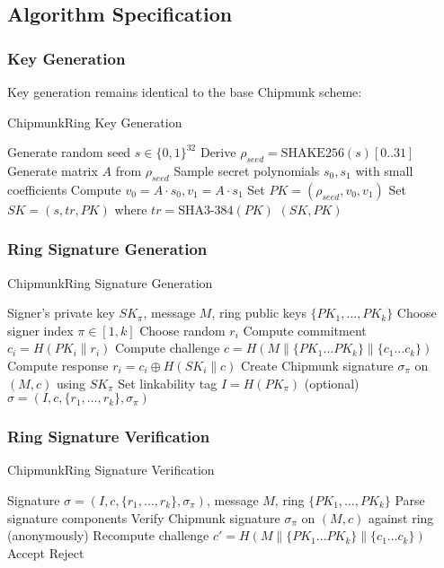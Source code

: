 \documentclass[11pt,a4paper]{article}
\begin{document}
\subsection{Algorithm Specification}

\subsubsection{Key Generation}
Key generation remains identical to the base Chipmunk scheme:
\begin{algorithm}
\caption{ChipmunkRing Key Generation}
\begin{algorithmic}[1]
\STATE Generate random seed $s \in \{0,1\}^{32}$
\STATE Derive $\rho_{seed} = \text{SHAKE256}(s)[0..31]$
\STATE Generate matrix $A$ from $\rho_{seed}$
\STATE Sample secret polynomials $s_0, s_1$ with small coefficients
\STATE Compute $v_0 = A \cdot s_0, v_1 = A \cdot s_1$
\STATE Set $PK = (\rho_{seed}, v_0, v_1)$
\STATE Set $SK = (s, tr, PK)$ where $tr = \text{SHA3-384}(PK)$
\RETURN $(SK, PK)$
\end{algorithmic}
\end{algorithm}

\subsubsection{Ring Signature Generation}
\begin{algorithm}
\caption{ChipmunkRing Signature Generation}
\begin{algorithmic}[1]
\REQUIRE Signer's private key $SK_\pi$, message $M$, ring public keys $\{PK_1, \ldots, PK_k\}$
\STATE Choose signer index $\pi \in [1,k]$
    \STATE Choose random $r_i$
    \STATE Compute commitment $c_i = H(PK_i \| r_i)$
\ENDFOR
\STATE Compute challenge $c = H(M \| \{PK_1 \ldots PK_k\} \| \{c_1 \ldots c_k\})$
    \STATE Compute response $r_i = c_i \oplus H(SK_i \| c)$
\ENDFOR
\STATE Create Chipmunk signature $\sigma_\pi$ on $(M, c)$ using $SK_\pi$
\STATE Set linkability tag $I = H(PK_\pi)$ (optional)
\RETURN $\sigma = (I, c, \{r_1, \ldots, r_k\}, \sigma_\pi)$
\end{algorithmic}
\end{algorithm}

\subsubsection{Ring Signature Verification}
\begin{algorithm}
\caption{ChipmunkRing Signature Verification}
\begin{algorithmic}[1]
\REQUIRE Signature $\sigma = (I, c, \{r_1, \ldots, r_k\}, \sigma_\pi)$, message $M$, ring $\{PK_1, \ldots, PK_k\}$
\STATE Parse signature components
\STATE Verify Chipmunk signature $\sigma_\pi$ on $(M, c)$ against ring (anonymously)
\STATE Recompute challenge $c' = H(M \| \{PK_1 \ldots PK_k\} \| \{c_1 \ldots c_k\})$
    \RETURN Accept
\ELSE
    \RETURN Reject
\ENDIF
\end{algorithmic}
\end{algorithm}
\end{document}
